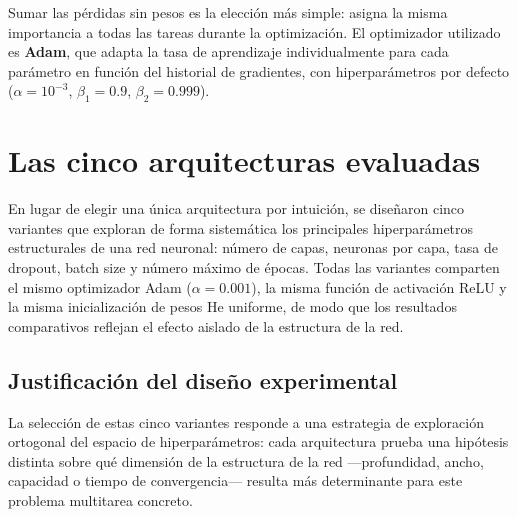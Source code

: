 \documentclass[12pt, a4paper]{report}
\begin{document}
Sumar las pérdidas sin pesos es la elección más simple: asigna la misma importancia a todas las tareas durante la optimización. El optimizador utilizado es \textbf{Adam}, que adapta la tasa de aprendizaje individualmente para cada parámetro en función del historial de gradientes, con hiperparámetros por defecto ($\alpha = 10^{-3}$, $\beta_1 = 0.9$, $\beta_2 = 0.999$).

\section{Las cinco arquitecturas evaluadas}

En lugar de elegir una única arquitectura por intuición, se diseñaron cinco variantes que exploran de forma sistemática los principales hiperparámetros estructurales de una red neuronal: número de capas, neuronas por capa, tasa de dropout, batch size y número máximo de épocas. Todas las variantes comparten el mismo optimizador Adam ($\alpha=0.001$), la misma función de activación ReLU y la misma inicialización de pesos He uniforme, de modo que los resultados comparativos reflejan el efecto aislado de la estructura de la red.

\subsection{Justificación del diseño experimental}

La selección de estas cinco variantes responde a una estrategia de exploración ortogonal del espacio de hiperparámetros: cada arquitectura prueba una hipótesis distinta sobre qué dimensión de la estructura de la red ---profundidad, ancho, capacidad o tiempo de convergencia--- resulta más determinante para este problema multitarea concreto.
\end{document}
